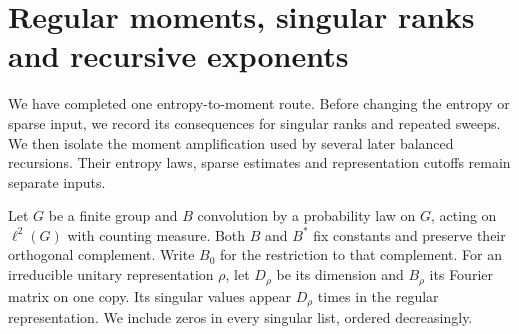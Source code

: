 \section{Regular moments, singular ranks and recursive exponents}\label{sec:spectral-conversion}
We have completed one entropy-to-moment route. Before changing the entropy or sparse input, we record its consequences for singular ranks and repeated sweeps. We then isolate the moment amplification used by several later balanced recursions. Their entropy laws, sparse estimates and representation cutoffs remain separate inputs.

Let $G$ be a finite group and $B$ convolution by a probability law on $G$, acting on $\ell^2(G)$ with counting measure. Both $B$ and $B^*$ fix constants and preserve their orthogonal complement. Write $B_0$ for the restriction to that complement. For an irreducible unitary representation $\rho$, let $D_\rho$ be its dimension and $B_\rho$ its Fourier matrix on one copy. Its singular values appear $D_\rho$ times in the regular representation. We include zeros in every singular list, ordered decreasingly.


